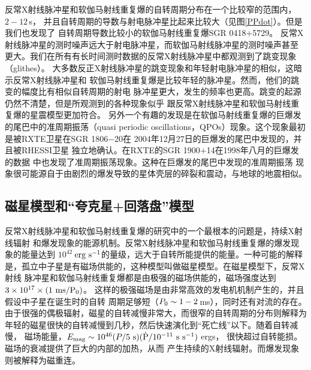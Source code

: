 反常X射线脉冲星和软伽马射线重复爆的自转周期分布在一个比较窄的范围内，$2-12$\,s，
并且自转周期的导数与射电脉冲星比起来比较大（见图\ref{PPdot}）。但是我们也发现了
自转周期导数比较小的软伽马射线重复爆SGR 0418$+$5729\supercite{ret10}。
%
反常X射线脉冲星的测时噪声远大于射电脉冲星，而软伽马射线脉冲星的测时噪声甚至
更大。我们在所有有长时间测时数据的反常X射线脉冲星中都观测到了跳变现象（glithes）。
大多数反正X射线脉冲星的跳变现象和年轻射电脉冲星的相似，这暗示反常X射线脉冲星和
软伽马射线重复爆是比较年轻的脉冲星。然而，他们的跳变的幅度比有相似自转周期的射电
脉冲星更大，发生的频率也更高。跳变的起源仍然不清楚，但是所观测到的各种现象似乎
跟反常X射线脉冲星和软伽马射线重复爆的星震模型更加符合\supercite{m08}。
%
另外一个有趣的发现是在软伽马射线重复爆的巨爆发的尾巴中的准周期振荡（quasi 
periodic oscillations，QPOs）现象。这个现象最初是被RXTE卫星在SGR 1806$-$20在
2004年12月27日的巨爆发的尾巴中发现的\supercite{ibs05}，并且被RHESSI卫星
独立地确认\supercite{ws06}。在RXTE的SGR 1900$+$14在1998年八月的巨爆发的数据
中也发现了准周期振荡现象\supercite{sw05}。这种在巨爆发的尾巴中发现的准周期振荡
现象很可能源自于由剧烈的爆发导致的星体壳层的碎裂和震动，与地球的地震相似\supercite{m08}。

\subsection{磁星模型和“夸克星+回落盘”模型}

反常X射线脉冲星和软伽马射线重复爆的研究中的一个最根本的问题是，持续X射线辐射
和爆发现象的能源机制。反常X射线脉冲星和软伽马射线重复爆的爆发现象的能量达到
$10^{42}$\,$\rm{erg\ s^{-1}}$的量级，远大于自转所能提供的能量。一种可能的解释
是，孤立中子星是有磁场供能的，这种模型叫做磁星模型。在磁星模型下，反常X射线
脉冲星和软伽马射线重复爆都是由极强的磁场供能的，磁场强度达到$3\times10^{17}\times(1\ \rm{ms}/P_{\rm{0}})$。
这样的极强磁场是由非常高效的发电机机制产生的，并且假设中子星在诞生时的自转
周期足够短（$P_{\rm{0}}\sim1-2$\,ms），同时还有对流的存在\supercite{td93}。
由于很强的偶极辐射，磁星的自转减慢非常大，而很窄的自转周期的分布则解释为
年轻的磁星很快的自转减慢到几秒，然后快速演化到“死亡线”以下。随着自转减慢，
磁场能量，$E_{\rm{mag}}\sim10^{46}(P/5\ \rm{s})(\dot P/10^{-11}\ \rm{s\ s^{-1}})$ ergs，
很快超过自转能损\supercite{m08}。磁场的衰减提供了巨大的内部的加热，从而
产生持续的X射线辐射。而爆发现象则被解释为磁重连\supercite{td93}。

